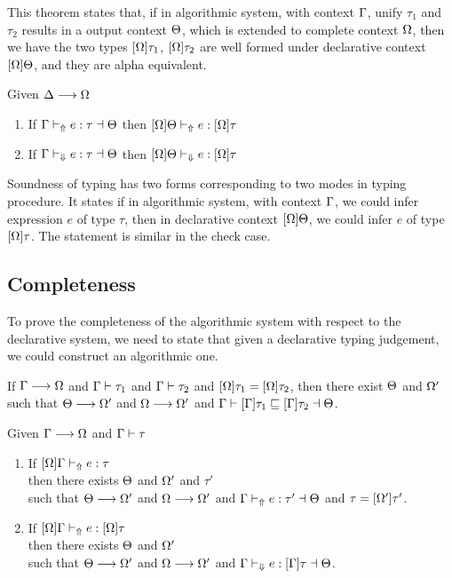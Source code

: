 This theorem states that, if in algorithmic system, with context $\Gamma$, unify $\tau_1$ and $\tau_2$ results in a output context $\Theta$, which is extended to complete context $\Omega$, then we have the two types $[\Omega]\tau_1$, $[\Omega]\tau_2$ are well formed under declarative context $[\Omega]\Theta$, and they are alpha equivalent.

\begin{theorem}

Given $\Delta \longrightarrow \Omega$
\begin{enumerate}
   \item If $\Gamma {} \vdash_\Uparrow e: \tau \dashv \Theta$ then $[\Omega]\Theta \vdash_\Uparrow e: [\Omega]\tau$
   \item If $\Gamma {} \vdash_\Downarrow e: \tau \dashv \Theta$ then $[\Omega]\Theta \vdash_\Downarrow e: [\Omega]\tau$
\end{enumerate}
\end{theorem}

Soundness of typing has two forms corresponding to two modes in typing procedure. It states if in algorithmic system, with context $\Gamma$, we could infer expression $e$ of type $\tau$, then in declarative context $[\Omega]\Theta$, we could infer $e$ of type $[\Omega]\tau$. The statement is similar in the check case.

\subsection{Completeness}

To prove the completeness of the algorithmic system with respect to the declarative system, we need to state that given a declarative typing judgement, we could construct an algorithmic one.

\begin{theorem}

If $\Gamma \longrightarrow \Omega$ and $\Gamma \vdash \tau_1$ and $\Gamma \vdash \tau_2$ and $[\Omega]\tau_1 = [\Omega]\tau_2$, then there exist $\Theta$ and $\Omega'$ such that $\Theta \longrightarrow \Omega'$ and $\Omega \longrightarrow \Omega'$ and $\Gamma \vdash [\Gamma]\tau_1 \sqsubseteq [\Gamma]\tau_2 \dashv \Theta$.
\end{theorem}

\begin{theorem}

Given $\Gamma \longrightarrow \Omega$ and $\Gamma \vdash \tau$
\begin{enumerate}
    \item If $[\Omega]\Gamma \vdash_\Uparrow e : \tau$\\
          then there exists $\Theta$ and $\Omega'$ and $\tau'$\\
          such that $\Theta \longrightarrow \Omega'$ and $\Omega \longrightarrow \Omega'$ and $\Gamma \vdash_\Uparrow e:\tau' \dashv \Theta$ and $\tau = [\Omega']\tau'$.
    \item If $[\Omega]\Gamma \vdash_\Uparrow e : [\Omega]\tau$\\
          then there exists $\Theta$ and $\Omega'$\\
          such that $\Theta \longrightarrow \Omega'$ and $\Omega \longrightarrow \Omega'$ and $\Gamma \vdash_\Downarrow e: [\Gamma]\tau \dashv \Theta$.
\end{enumerate}
\end{theorem}
